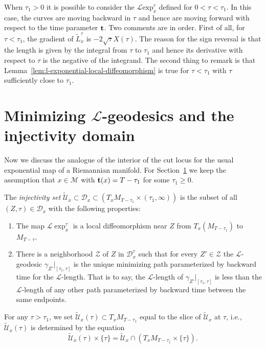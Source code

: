 \begin{remark}\label{rem:l-exponential-backward-tau}
\label{backwards}

When $\tau_1>0$ it is possible to consider the ${\mathcal L}\mathrm{exp}^{\tau}_x$ defined for $0<\tau<\tau_1$. In this case, the curves
are moving backward in $\tau$ and hence are moving forward with
respect to the time parameter ${\bf t}$. Two comments are in order.
First of all, for $\tau<\tau_1$, the gradient of ${\widetilde
L}^{\tau}_x$ is $-2\sqrt{\tau}X(\tau)$. The reason for the sign
reversal is that the length is given by the integral from $\tau$ to
$\tau_1$ and hence its derivative with respect to $\tau$ is the
negative of the integrand. The second thing to remark is that
Lemma~\ref{lem:l-exponential-local-diffeomorphism} is true for $\tau<\tau_1$ with $\tau$
sufficiently close to $\tau_1$.
\end{remark}

\section{Minimizing ${\mathcal L}$-geodesics and the injectivity
domain}\label{sect:InjDom}

Now we discuss the analogue of the interior of the cut locus for the
usual exponential map of a Riemannian manifold. For
Section~\ref{sect:InjDom} we keep the assumption that $x\in
{\mathcal M}$ with ${\bf t}(x)=T-\tau_1$ for some $\tau_1\ge 0$.


\begin{definition}\label{def:l-injectivity-set}
\label{injdefn}

 The {\sl injectivity set}
$\widetilde{\mathcal U}_x\subset {\mathcal D}_x\subset
\left(T_xM_{T-\tau_1}\times (\tau_1,\infty)\right)$ is the subset of all $(Z,\tau)\in {\mathcal D}_x$ with the following
properties:
\begin{enumerate}
\item The map ${\mathcal L}\exp_x^{\tau}$ is a local
diffeomorphism near $Z$ from $T_x(M_{T-\tau_1})$ to $M_{T-\tau}$.
\item There is a neighborhood ${\mathcal Z}$ of $Z$ in ${\mathcal D}^{\tau}_x$
 such that for every $Z'\in {\mathcal Z}$ the ${\mathcal L}$-geodesic
$\gamma_{Z'}|_{[\tau_1,\tau]}$ is the unique minimizing path
parameterized by backward time for the ${\mathcal L}$-length. That
is to say, the ${\mathcal L}$-length of
$\gamma_{Z'}|_{[\tau_1,\tau]}$ is less than the ${\mathcal
L}$-length of any other path parameterized by backward time between
the same endpoints.
\end{enumerate}
For any $\tau>\tau_1$, we set $\widetilde {\mathcal
U}_x(\tau)\subset T_xM_{T-\tau_1}$ equal to the slice of $\widetilde{\mathcal U}_x$ at
$\tau$, i.e., $\widetilde {\mathcal U}_x(\tau)$ is determined by the
equation
$$\widetilde{\mathcal
U}_x(\tau)\times\{\tau\}=\widetilde{\mathcal
U}_x\cap\left(T_xM_{T-\tau_1}\times\{\tau\}\right).$$
\end{definition}

